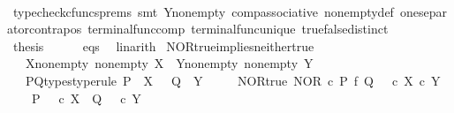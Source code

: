 \begin{isabellebody}
\ \ \ \ \ \ \isamarkupfalse%
\ {\isacharparenleft}{\kern0pt}typecheck{\isacharunderscore}{\kern0pt}cfuncs{\isacharunderscore}{\kern0pt}prems{\isacharcomma}{\kern0pt}\ smt\ Y{\isacharunderscore}{\kern0pt}nonempty\ comp{\isacharunderscore}{\kern0pt}associative{}\ nonempty{\isacharunderscore}{\kern0pt}def\ one{\isacharunderscore}{\kern0pt}separator{\isacharunderscore}{\kern0pt}contrapos\ terminal{\isacharunderscore}{\kern0pt}func{\isacharunderscore}{\kern0pt}comp\ terminal{\isacharunderscore}{\kern0pt}func{\isacharunderscore}{\kern0pt}unique\ true{\isacharunderscore}{\kern0pt}false{\isacharunderscore}{\kern0pt}distinct{\isacharparenright}{\kern0pt}\isanewline
\ \ \isamarkupfalse%
\isanewline
\ \ \isamarkupfalse%
\ \isamarkupfalse%
\ {\isacharquery}{\kern0pt}thesis\isanewline
\ \ \ \ \isamarkupfalse%
\ eqs\ \isamarkupfalse%
\ linarith\isanewline
{}\isamarkupfalse%
%
\endisatagproof
{\isafoldproof}%
%
\isadelimproof
\isanewline
%
\endisadelimproof
\isanewline
{}\isamarkupfalse%
\ NOR{\isacharunderscore}{\kern0pt}true{\isacharunderscore}{\kern0pt}implies{\isacharunderscore}{\kern0pt}neither{\isacharunderscore}{\kern0pt}true{\isacharcolon}{\kern0pt}\isanewline
\ \ \ X{\isacharunderscore}{\kern0pt}nonempty{\isacharcolon}{\kern0pt}\ {\isachardoublequoteopen}nonempty\ X{\isachardoublequoteclose}\ \ Y{\isacharunderscore}{\kern0pt}nonempty{\isacharcolon}{\kern0pt}\ {\isachardoublequoteopen}nonempty\ Y{\isachardoublequoteclose}\isanewline
\ \ \ P{\isacharunderscore}{\kern0pt}Q{\isacharunderscore}{\kern0pt}types{\isacharbrackleft}{\kern0pt}type{\isacharunderscore}{\kern0pt}rule{\isacharbrackright}{\kern0pt}{\isacharcolon}{\kern0pt}\ {\isachardoublequoteopen}P\ {\isacharcolon}{\kern0pt}\ X\ {\isasymrightarrow}\ {\isasymOmega}{\isachardoublequoteclose}\ {\isachardoublequoteopen}Q\ {\isacharcolon}{\kern0pt}\ Y\ {\isasymrightarrow}\ {\isasymOmega}{\isachardoublequoteclose}\isanewline
\ \ \ NOR{\isacharunderscore}{\kern0pt}true{\isacharcolon}{\kern0pt}\ {\isachardoublequoteopen}NOR\ {\isasymcirc}\isactrlsub c\ {\isacharparenleft}{\kern0pt}P\ {\isasymtimes}\isactrlsub f\ Q{\isacharparenright}{\kern0pt}\ {\isacharequal}{\kern0pt}\ {\isasymt}\ {\isasymcirc}\isactrlsub c\ {\isasymbeta}\isactrlbsub X\ {\isasymtimes}\isactrlsub c\ Y\isactrlesub {\isachardoublequoteclose}\isanewline
\ \ \ {\isachardoublequoteopen}{\isasymnot}\ {\isacharparenleft}{\kern0pt}P\ {\isacharequal}{\kern0pt}\ {\isasymt}\ {\isasymcirc}\isactrlsub c\ {\isasymbeta}\isactrlbsub X\isactrlesub \ {\isasymor}\ Q\ {\isacharequal}{\kern0pt}\ {\isasymt}\ {\isasymcirc}\isactrlsub c\ {\isasymbeta}\isactrlbsub Y\isactrlesub {\isacharparenright}{\kern0pt}{\isachardoublequoteclose}\isanewline

\end{isabellebody}
